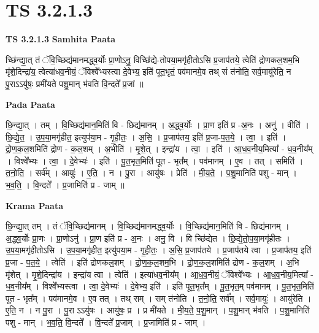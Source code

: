 \documentclass[17pt]{extarticle}
\begin{document}

\section{ TS 3.2.1.3 }

\textbf{TS 3.2.1.3 } \newline
\textbf{Samhita Paata} \newline

च्छि॑न्द्या॒त् तं ॅवि॒च्छिद्य॑मानमद्ध्व॒र्योः प्रा॒णोऽनु॒ विच्छि॑द्ये-तोपया॒मगृ॑हीतोऽसि प्र॒जाप॑तये॒ त्वेति॑ द्रोणकल॒शम॒भि मृ॑शे॒दिन्द्रा॑य॒ त्वेत्या॑धव॒नीयं॒ ॅविश्वे᳚भ्यस्त्वा दे॒वेभ्य॒ इति॑ पूत॒भृतं॒ पव॑मानमे॒व तथ् सं त॑नोति॒ सर्व॒मायु॑रेति॒ न पु॒राऽऽयु॑षः॒ प्रमी॑यते पशु॒मान् भ॑वति वि॒न्दते᳚ प्र॒जां ॥ \newline

\textbf{Pada Paata} \newline

छि॒न्द्या॒त् । तम् । वि॒च्छिद्य॑मान॒मिति॑ वि - छिद्य॑मानम् । अ॒द्ध्व॒र्योः । प्रा॒ण इति॑ प्र -अ॒नः । अनु॑ । वीति॑ । छि॒द्ये॒त॒ । उ॒प॒या॒मगृ॑हीत॒ इत्युप॑या॒म - गृ॒ही॒तः॒ । अ॒सि॒ । प्र॒जाप॑तय॒ इति॑ प्र॒जा-प॒त॒ये॒ । त्वा॒ । इति॑ । द्रो॒ण॒क॒ल॒शमिति॑ द्रोण - क॒ल॒शम् । अ॒भीति॑ । मृ॒शे॒त् । इन्द्रा॑य । त्वा॒ । इति॑ । आ॒ध॒व॒नीय॒मित्या᳚ - ध॒व॒नीय᳚म् । विश्वे᳚भ्यः । त्वा॒ । दे॒वेभ्यः॑ । इति॑ । पू॒त॒भृत॒मिति॑ पूत - भृत᳚म् । पव॑मानम् । ए॒व । तत् । समिति॑ । त॒नो॒ति॒ । सर्व᳚म् । आयुः॑ । ए॒ति॒ । न । पु॒रा । आयु॑षः । प्रेति॑ । मी॒य॒ते॒ । प॒शु॒मानिति॑ पशु - मान् । भ॒व॒ति॒ । वि॒न्दते᳚ । प्र॒जामिति॑ प्र - जाम् ॥  \newline


\textbf{Krama Paata} \newline

छि॒न्द्या॒त् तम् । तं ॅवि॒च्छिद्य॑मानम् । वि॒च्छिद्य॑मानमद्ध्व॒र्योः । वि॒च्छिद्य॑मान॒मिति॑ वि - छिद्य॑मानम् । अ॒द्ध्व॒र्योः प्रा॒णः । प्रा॒णोऽनु॑ । प्रा॒ण इति॑ प्र - अ॒नः । अनु॒ वि । वि च्छि॑द्येत । छि॒द्ये॒तो॒प॒या॒मगृ॑हीतः । उ॒प॒या॒मगृ॑हीतोऽसि । उ॒प॒या॒मगृ॑हीत॒ इत्यु॑पया॒म - गृ॒ही॒तः॒ । अ॒सि॒ प्र॒जाप॑तये । प्र॒जाप॑तये त्वा । प्र॒जाप॑तय॒ इति॑ प्र॒जा - प॒त॒ये॒ । त्वेति॑ । इति॑ द्रोणकल॒शम् । द्रो॒ण॒क॒ल॒शम॒भि । द्रो॒ण॒क॒ल॒शमिति॑ द्रोण - क॒ल॒शम् । अ॒भि मृ॑शेत् । मृ॒शे॒दिन्द्रा॑य । इन्द्रा॑य त्वा । त्वेति॑ । इत्या॑धव॒नीय᳚म् । आ॒ध॒व॒नीयं॒ ॅविश्वे᳚भ्यः । आ॒ध॒व॒नीय॒मित्या᳚ - ध॒व॒नीय᳚म् । विश्वे᳚भ्यस्त्वा । त्वा॒ दे॒वेभ्यः॑ । दे॒वेभ्य॒ इति॑ । इति॑ पूत॒भृत᳚म् । पू॒त॒भृत॒म् पव॑मानम् । पू॒त॒भृत॒मिति॑ पूत - भृत᳚म् । पव॑मानमे॒व । ए॒व तत् । तथ् सम् । सम् त॑नोति । त॒नो॒ति॒ सर्व᳚म् । सर्व॒मायुः॑ । आयु॑रेति । ए॒ति॒ न । न पु॒रा । 
पु॒रा ऽऽयु॑षः । आयु॑षः॒ प्र । प्र मी॑यते । मी॒य॒ते॒ प॒शु॒मान् । प॒शु॒मान् भ॑वति । प॒शु॒मानिति॑ पशु - मान् । भ॒व॒ति॒ वि॒न्दते᳚ । वि॒न्दते᳚ प्र॒जाम् । प्र॒जामिति॑ प्र - जाम् । \newline
\end{document}
